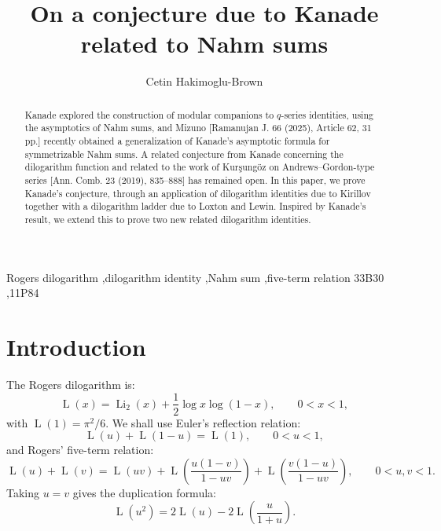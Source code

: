 \documentclass[preprint,12pt,number]{elsarticle}
\theoremstyle{remark}
\newcommand{\Lr}{\operatorname{L}}
\begin{document}
\begin{frontmatter}

\title{On a conjecture due to Kanade related to Nahm sums}

\author[Berk]{Cetin Hakimoglu-Brown}
\address[Berk]{Berkeley, CA, USA}

\begin{abstract}
Kanade explored the construction of modular companions to $q$-series identities,
using the asymptotics of Nahm sums, and Mizuno [Ramanujan J. 66 (2025), Article 62, 31 pp.] recently obtained a generalization of Kanade's asymptotic formula
for symmetrizable Nahm sums. A related conjecture from Kanade concerning the
dilogarithm function and related to the work of Kur\c{s}ung\"oz on
Andrews--Gordon-type series [Ann. Comb. 23 (2019), 835--888] has remained open.
In this paper, we prove Kanade's conjecture, through an application of
dilogarithm identities due to Kirillov together with a dilogarithm ladder due
to Loxton and Lewin. Inspired by  Kanade's result, we extend this to prove two new related dilogarithm identities.





\end{abstract}

\begin{keyword}
Rogers dilogarithm \sep dilogarithm identity \sep Nahm sum \sep five-term relation
\MSC[2020] 33B30 \sep 11P84
\end{keyword}

\end{frontmatter}

\section{Introduction}

The Rogers dilogarithm is:
\begin{equation}\label{eq:Ldef}
\Lr(x)=\operatorname{Li}_2(x)+\frac12\log x\log(1-x),
\qquad 0<x<1,
\end{equation}
with $\Lr(1)=\pi^2/6$.  We shall use Euler's reflection relation:
\begin{equation}\label{eq:reflection}
\Lr(u)+\Lr(1-u)=\Lr(1),\qquad 0<u<1,
\end{equation}
and Rogers' five-term relation:
\begin{equation}\label{eq:fiveterm}
\Lr(u)+\Lr(v)=\Lr(uv)
+\Lr\!\left(\frac{u(1-v)}{1-uv}\right)
+\Lr\!\left(\frac{v(1-u)}{1-uv}\right),
\qquad 0<u,v<1.
\end{equation}
Taking $u=v$ gives the duplication formula:
\begin{equation}\label{eq:dup}
\Lr(u^2)=2\Lr(u)-2\Lr\!\left(\frac{u}{1+u}\right).
\end{equation}
\end{document}
